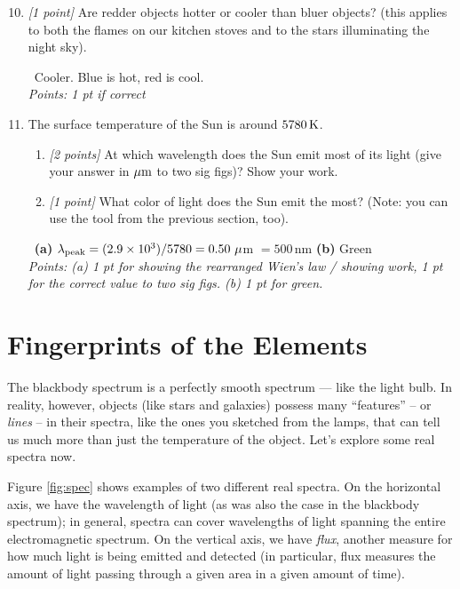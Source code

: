 \documentclass[11pt]{article}
\newcommand{\ans}[1]{%
  \par\smallskip\noindent{\color{blue!55!black}\textbf{Answer:}}\ #1\par\smallskip}
\begin{document}
\begin{enumerate}
    \setcounter{enumi}{9}

    \item \textit{[1 point]} Are redder objects hotter or cooler than bluer objects? (this applies to both the flames on our kitchen stoves and to the stars illuminating the night sky).

    \ans{Cooler. Blue is hot, red is cool.
    \\[2pt]
    \emph{Points: 1 pt if correct}}

    \item The surface temperature of the Sun is around $5780 \, {\rm K}$.
    \begin{enumerate}
        \item \textit{[2 points]} At which wavelength does the Sun emit most of its light (give your answer in $\rm \mu m$ to two sig figs)? Show your work.
        \item \textit{[1 point]} What color of light does the Sun emit the most? (Note: you can use the tool from the previous section, too).
    \end{enumerate}

    \ans{\textbf{(a)} $\lambda_{\rm peak}=(2.9\times10^3)/5780=0.50\ \mu$m
    $=500$\,nm \textbf{(b)} Green
    \\[2pt]
    \emph{Points: (a) 1 pt for showing the rearranged Wien's law / showing work, 1 pt for the correct value to two sig figs. (b) 1 pt for
    green.}}
\end{enumerate}

\section{Fingerprints of the Elements}

The blackbody spectrum is a perfectly smooth spectrum --- like the light bulb. In reality, however, objects (like stars and galaxies) possess many ``features'' -- or \emph{lines} -- in their spectra, like the ones you sketched from the lamps, that can tell us much more than just the temperature of the object. Let's explore some real spectra now.

Figure \ref{fig:spec} shows examples of two different real spectra. On the horizontal axis, we have the wavelength of light (as was also the case in the blackbody spectrum); in general, spectra can cover wavelengths of light spanning the entire electromagnetic spectrum. On the vertical axis, we have \textit{flux}, another measure for how much light is being emitted and detected (in particular, flux measures the amount of light passing through a given area in a given amount of time).
\end{document}
